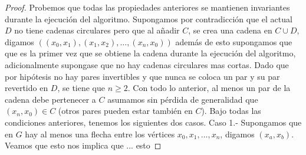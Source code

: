 \begin{teorema}
\begin{proof}
    Probemos que todas las propiedades anteriores se mantienen invariantes durante la ejecución del algoritmo.
    Supongamos por contradicción que el actual $D$ no tiene cadenas circulares pero que al añadir $C$, se crea una cadena en $C\cup D$, digamos $((x_0,x_1),(x_1,x_2),\dots, (x_n,x_0))$ además de esto supongamos que que es la primer vez que se obtiene la cadena durante la ejecución del algoritmo, adicionalmente supongase que no hay cadenas circulares mas cortas. Dado que por hipótesis no hay pares invertibles y que nunca se coloca un par y su par revertido en $D$, se tiene que $n\geq 2$. Con todo lo anterior, al menos un par de la cadena debe pertenecer a $C$ asumamos sin pérdida de generalidad que $(x_n,x_0)\in C$ (otros pares pueden estar también en $C$).
    Bajo todas las condiciones anteriores, tenemos los siguientes dos casos.
    Caso 1.- Supongamos que en $G$ hay al menos una flecha entre los vértices $x_0,x_1,\dots,x_n$, digamos $(x_a,x_b)$. Veamos que esto nos implica que ... esto
 \end{proof}
        
        
        
        
 \end{teorema}